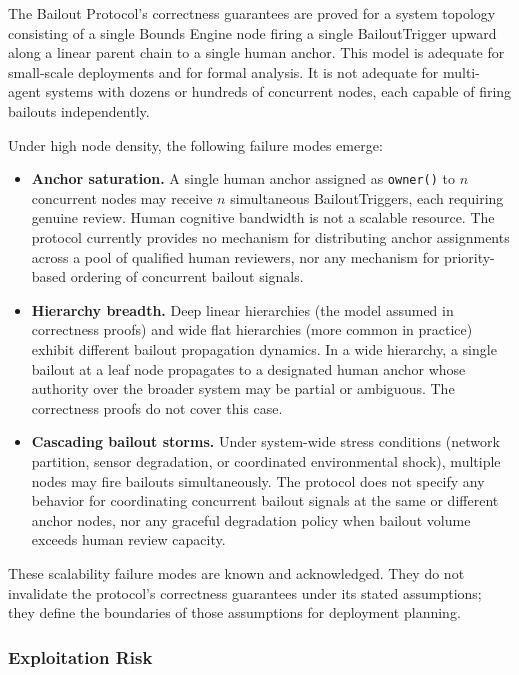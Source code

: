 The Bailout Protocol's correctness guarantees are proved for a system topology consisting of a single Bounds Engine node firing a single BailoutTrigger upward along a linear parent chain to a single human anchor. This model is adequate for small-scale deployments and for formal analysis. It is not adequate for multi-agent systems with dozens or hundreds of concurrent nodes, each capable of firing bailouts independently.

Under high node density, the following failure modes emerge:

\begin{itemize}\setlength\itemsep{0.25em}
\item \textbf{Anchor saturation.} A single human anchor assigned as \texttt{owner()} to $n$ concurrent nodes may receive $n$ simultaneous BailoutTriggers, each requiring genuine review. Human cognitive bandwidth is not a scalable resource. The protocol currently provides no mechanism for distributing anchor assignments across a pool of qualified human reviewers, nor any mechanism for priority-based ordering of concurrent bailout signals.
\item \textbf{Hierarchy breadth.} Deep linear hierarchies (the model assumed in correctness proofs) and wide flat hierarchies (more common in practice) exhibit different bailout propagation dynamics. In a wide hierarchy, a single bailout at a leaf node propagates to a designated human anchor whose authority over the broader system may be partial or ambiguous. The correctness proofs do not cover this case.
\item \textbf{Cascading bailout storms.} Under system-wide stress conditions (network partition, sensor degradation, or coordinated environmental shock), multiple nodes may fire bailouts simultaneously. The protocol does not specify any behavior for coordinating concurrent bailout signals at the same or different anchor nodes, nor any graceful degradation policy when bailout volume exceeds human review capacity.
\end{itemize}

These scalability failure modes are known and acknowledged. They do not invalidate the protocol's correctness guarantees under its stated assumptions; they define the boundaries of those assumptions for deployment planning.

\subsubsection{Exploitation Risk}\label{sec:exploitation-risk}


